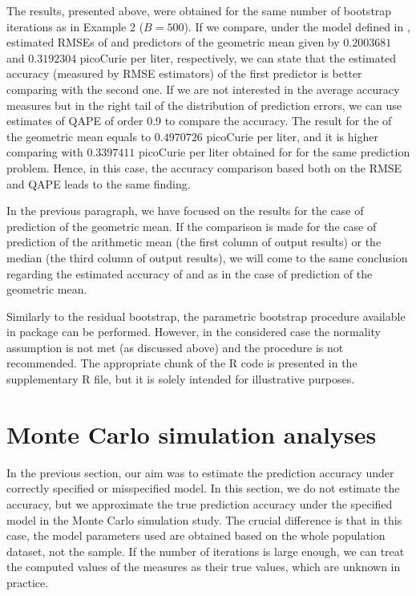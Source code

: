 The results, presented above, were obtained for the same number of bootstrap iterations as in Example 2 ($B = 500$). If we compare, under the model defined in , estimated RMSEs of  and  predictors  of the geometric mean given by $0.2003681$ and $0.3192304$ picoCurie per liter, respectively, we can state that the estimated accuracy (measured by RMSE estimators) of the first predictor is better comparing with the second one. If we are not interested in the average accuracy measures but in the right tail of the distribution of prediction errors, we can use estimates of QAPE of order 0.9 to compare the accuracy. The result for the  of the geometric mean equals to $0.4970726$ picoCurie per liter, and it is higher comparing with $0.3397411$ picoCurie per liter obtained for  for the same prediction problem. Hence, in this case, the accuracy comparison based both on the RMSE and QAPE leads to the same finding.

In the previous paragraph, we have focused on the results for the case of prediction of the geometric mean. If the comparison is made for the case of prediction of the arithmetic mean (the first column of output results) or the median (the third column of output results), we will come to the same conclusion regarding the estimated accuracy of  and  as in the case of prediction of the geometric mean.

Similarly to the residual bootstrap, the parametric bootstrap procedure  available in  package can be performed. However, in the considered case the normality assumption is not met (as discussed above) and the procedure is not recommended. The appropriate chunk of the R code is presented in the supplementary R file, but it is solely intended for illustrative purposes.

\section{Monte Carlo simulation analyses}

In the previous section, our aim was to estimate the prediction accuracy under correctly specified or misspecified model. In this section, we do not estimate the accuracy, but we approximate the true prediction accuracy under the specified model in the Monte Carlo simulation study. The crucial difference is that in this case, the model parameters used are obtained based on the whole population dataset, not the sample. If the number of iterations is large enough, we can treat the computed values of the measures as their true values, which are unknown in practice.

